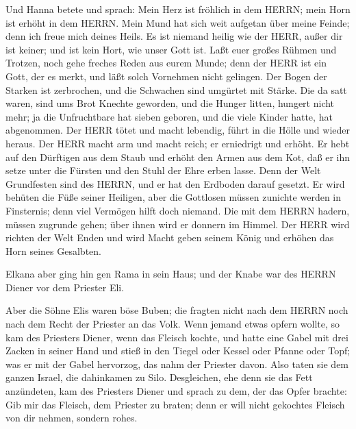  Und Hanna betete und sprach: Mein Herz ist fröhlich in dem
HERRN; mein Horn ist erhöht in dem HERRN. Mein Mund hat sich weit
aufgetan über meine Feinde; denn ich freue mich deines Heils.
 Es ist niemand heilig wie der HERR, außer dir ist keiner;
und ist kein Hort, wie unser Gott ist.  Laßt euer großes
Rühmen und Trotzen, noch gehe freches Reden aus eurem Munde; denn der
HERR ist ein Gott, der es merkt, und läßt solch Vornehmen nicht
gelingen.  Der Bogen der Starken ist zerbrochen, und die
Schwachen sind umgürtet mit Stärke.  Die da satt waren, sind
ums Brot Knechte geworden, und die Hunger litten, hungert nicht mehr; ja
die Unfruchtbare hat sieben geboren, und die viele Kinder hatte, hat
abgenommen.  Der HERR tötet und macht lebendig, führt in die
Hölle und wieder heraus.  Der HERR macht arm und macht
reich; er erniedrigt und erhöht.  Er hebt auf den Dürftigen
aus dem Staub und erhöht den Armen aus dem Kot, daß er ihn setze unter
die Fürsten und den Stuhl der Ehre erben lasse. Denn der Welt
Grundfesten sind des HERRN, und er hat den Erdboden darauf gesetzt.
 Er wird behüten die Füße seiner Heiligen, aber die
Gottlosen müssen zunichte werden in Finsternis; denn viel Vermögen hilft
doch niemand.  Die mit dem HERRN hadern, müssen zugrunde
gehen; über ihnen wird er donnern im Himmel. Der HERR wird richten der
Welt Enden und wird Macht geben seinem König und erhöhen das Horn seines
Gesalbten.

 Elkana aber ging hin gen Rama in sein Haus; und der Knabe
war des HERRN Diener vor dem Priester Eli.

 Aber die Söhne Elis waren böse Buben; die fragten nicht
nach dem HERRN  noch nach dem Recht der Priester an das
Volk. Wenn jemand etwas opfern wollte, so kam des Priesters Diener, wenn
das Fleisch kochte, und hatte eine Gabel mit drei Zacken in seiner Hand
 und stieß in den Tiegel oder Kessel oder Pfanne oder Topf;
was er mit der Gabel hervorzog, das nahm der Priester davon. Also taten
sie dem ganzen Israel, die dahinkamen zu Silo. 
Desgleichen, ehe denn sie das Fett anzündeten, kam des Priesters Diener
und sprach zu dem, der das Opfer brachte: Gib mir das Fleisch, dem
Priester zu braten; denn er will nicht gekochtes Fleisch von dir nehmen,
sondern rohes.

